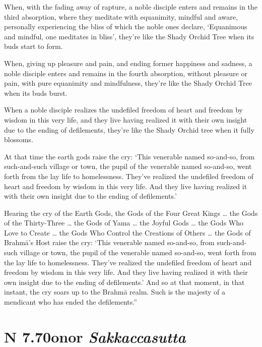\documentclass[12pt,openany]{book}%
\newcommand*{\suttatitleacronym}[1]{\smaller[2]{#1}\vspace*{.3em}}
\newcommand*{\suttatitletranslation}[1]{\linebreak{#1}}
\newcommand*{\suttatitleroot}[1]{\linebreak\smaller[2]\itshape{#1}}
\newcommand*{\tocacronym}[1]{\hspace*{-3.3em}{#1}\quad}
\newcommand*{\toctranslation}[1]{#1}
\newcommand*{\tocroot}[1]{(\textit{#1})}
\begin{document}
When, with the fading away of rapture, a noble disciple enters and remains in the third absorption, where they meditate with equanimity, mindful and aware, personally experiencing the bliss of which the noble ones declare, ‘Equanimous and mindful, one meditates in bliss’, they’re like the Shady Orchid Tree when its buds start to form. 

When, giving up pleasure and pain, and ending former happiness and sadness, a noble disciple enters and remains in the fourth absorption, without pleasure or pain, with pure equanimity and mindfulness, they’re like the Shady Orchid Tree when its buds burst. 

When a noble disciple realizes the undefiled freedom of heart and freedom by wisdom in this very life, and they live having realized it with their own insight due to the ending of defilements, they’re like the Shady Orchid tree when it fully blossoms. 

At that time the earth gods raise the cry: ‘This venerable named so-and-so, from such-and-such village or town, the pupil of the venerable named so-and-so, went forth from the lay life to homelessness. They’ve realized the undefiled freedom of heart and freedom by wisdom in this very life. And they live having realized it with their own insight due to the ending of defilements.’ 

Hearing the cry of the Earth Gods, the Gods of the Four Great Kings … the Gods of the Thirty-Three … the Gods of Yama … the Joyful Gods … the Gods Who Love to Create … the Gods Who Control the Creations of Others … the Gods of \textsanskrit{Brahmā}’s Host raise the cry: ‘This venerable named so-and-so, from such-and-such village or town, the pupil of the venerable named so-and-so, went forth from the lay life to homelessness. They’ve realized the undefiled freedom of heart and freedom by wisdom in this very life. And they live having realized it with their own insight due to the ending of defilements.’ And so at that moment, in that instant, the cry soars up to the \textsanskrit{Brahmā} realm. Such is the majesty of a mendicant who has ended the defilements.” 

%
\section*{{\suttatitleacronym AN 7.70}{\suttatitletranslation Honor }{\suttatitleroot Sakkaccasutta}}
\addcontentsline{toc}{section}{\tocacronym{AN 7.70} \toctranslation{Honor } \tocroot{Sakkaccasutta}}
\end{document}
